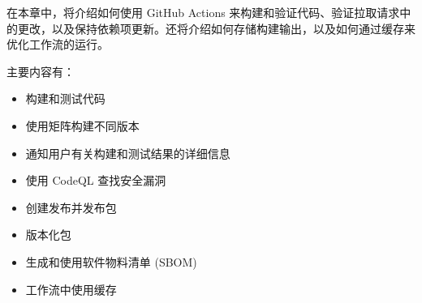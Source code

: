 在本章中，将介绍如何使用 GitHub Actions 来构建和验证代码、验证拉取请求中的更改，以及保持依赖项更新。还将介绍如何存储构建输出，以及如何通过缓存来优化工作流的运行。

主要内容有：

\begin{itemize}
\item 
构建和测试代码

\item 
使用矩阵构建不同版本

\item 
通知用户有关构建和测试结果的详细信息

\item 
使用 CodeQL 查找安全漏洞

\item 
创建发布并发布包

\item 
版本化包

\item 
生成和使用软件物料清单 (SBOM)

\item 
工作流中使用缓存
\end{itemize}

